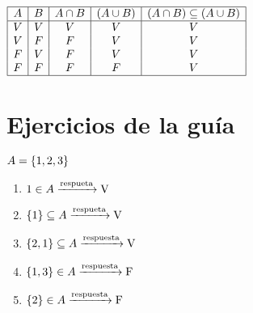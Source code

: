 \begin{enumerate}[label=\arabic*)]
	      $\begin{array}{|c|c|c|c|c|}
			      \hline
			      A & B & A \cap B & (A \cup B) & (A \cap B) \subseteq (A \cup B) \\ \hline
			      V & V & V          & V            & V                                   \\
			      V & F & F          & V            & V                                   \\
			      F & V & F          & V            & V                                   \\
			      F & F & F          & F            & V                                   \\ \hline
		      \end{array}
	      $
\end{enumerate}

\newpage
\section*{Ejercicios de la guía}

\ejercicio
$A = \left\{ 1,2,3 \right\}$
\begin{multicols}{2}
	\begin{enumerate}[label=(\roman*)]
		\item $1 \en A \flecha{respueta} \text{V}$
		\item $\set{1} \subseteq A \flecha{respueta} \text{V}$
		\item $\set{2,1} \subseteq A \flecha{respuesta} \text{V}$
		\item $\set{1,3} \en A \flecha{respuesta} \text{F}$
		\item $\set{2} \en A \flecha{respuesta} \text{F}$
	\end{enumerate}
\end{multicols}

